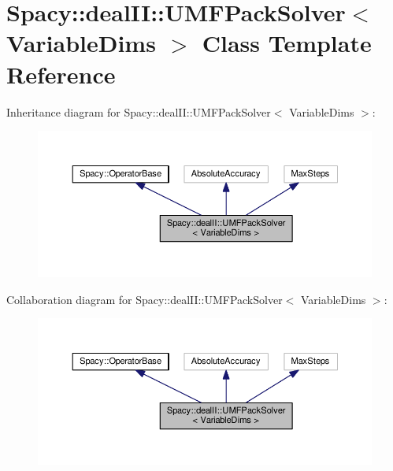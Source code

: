 \hypertarget{classSpacy_1_1dealII_1_1UMFPackSolver}{\section{Spacy\-:\-:deal\-I\-I\-:\-:U\-M\-F\-Pack\-Solver$<$ Variable\-Dims $>$ Class Template Reference}
\label{classSpacy_1_1dealII_1_1UMFPackSolver}
}


Inheritance diagram for Spacy\-:\-:deal\-I\-I\-:\-:U\-M\-F\-Pack\-Solver$<$ Variable\-Dims $>$\-:
\nopagebreak
\begin{figure}[H]
\begin{center}
\leavevmode
\includegraphics[width=350pt]{classSpacy_1_1dealII_1_1UMFPackSolver__inherit__graph}
\end{center}
\end{figure}


Collaboration diagram for Spacy\-:\-:deal\-I\-I\-:\-:U\-M\-F\-Pack\-Solver$<$ Variable\-Dims $>$\-:
\nopagebreak
\begin{figure}[H]
\begin{center}
\leavevmode
\includegraphics[width=350pt]{classSpacy_1_1dealII_1_1UMFPackSolver__coll__graph}
\end{center}
\end{figure}
